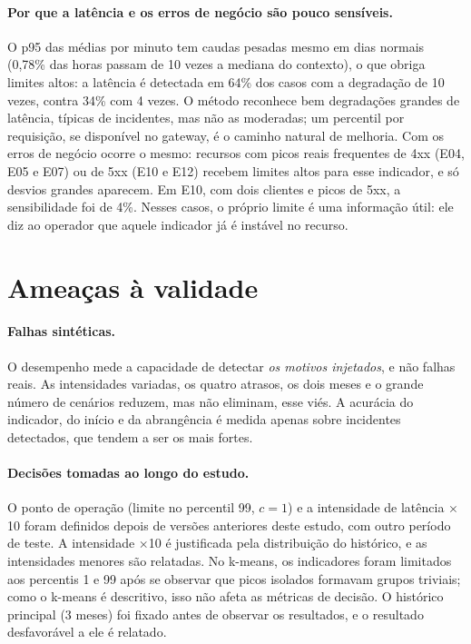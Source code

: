 \documentclass[sigconf,nonacm]{acmart}
\begin{document}
\paragraph{Por que a latência e os erros de negócio são pouco sensíveis.} O p95 das médias por minuto tem caudas pesadas mesmo em dias normais (0,78\% das horas passam de 10 vezes a mediana do contexto), o que obriga limites altos: a latência é detectada em 64\% dos casos com a degradação de 10 vezes, contra 34\% com 4 vezes. O método reconhece bem degradações grandes de latência, típicas de incidentes, mas não as moderadas; um percentil por requisição, se disponível no gateway, é o caminho natural de melhoria. Com os erros de negócio ocorre o mesmo: recursos com picos reais frequentes de 4xx (E04, E05 e E07) ou de 5xx (E10 e E12) recebem limites altos para esse indicador, e só desvios grandes aparecem. Em E10, com dois clientes e picos de 5xx, a sensibilidade foi de 4\%. Nesses casos, o próprio limite é uma informação útil: ele diz ao operador que aquele indicador já é instável no recurso.

\section{Ameaças à validade}\label{sec:ameacas}

\paragraph{Falhas sintéticas.} O desempenho mede a capacidade de detectar \emph{os motivos injetados}, e não falhas reais. As intensidades variadas, os quatro atrasos, os dois meses e o grande número de cenários reduzem, mas não eliminam, esse viés. A acurácia do indicador, do início e da abrangência é medida apenas sobre incidentes detectados, que tendem a ser os mais fortes.

\paragraph{Decisões tomadas ao longo do estudo.} O ponto de operação (limite no percentil 99, $c=1$) e a intensidade de latência $\times$10 foram definidos depois de versões anteriores deste estudo, com outro período de teste. A intensidade $\times$10 é justificada pela distribuição do histórico, e as intensidades menores são relatadas. No k-means, os indicadores foram limitados aos percentis 1 e 99 após se observar que picos isolados formavam grupos triviais; como o k-means é descritivo, isso não afeta as métricas de decisão. O histórico principal (3 meses) foi fixado antes de observar os resultados, e o resultado desfavorável a ele é relatado.
\end{document}
